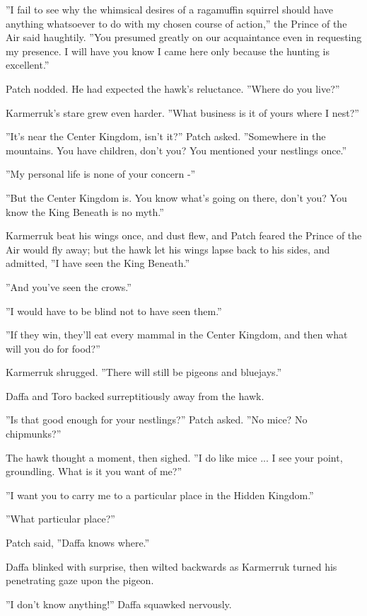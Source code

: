 \documentclass[12pt]{book}
\begin{document}
 ''I fail to see why the whimsical desires of a ragamuffin squirrel should have anything whatsoever to do with my chosen course of action,'' the Prince of the Air said haughtily. ''You presumed greatly on our acquaintance even in requesting my presence. I will have you know I came here only because the hunting is excellent.''\par
 Patch nodded. He had expected the hawk's reluctance. ''Where do you live?''\par
 Karmerruk's stare grew even harder. ''What business is it of yours where I nest?''\par
 ''It's near the Center Kingdom, isn't it?'' Patch asked. ''Somewhere in the mountains. You have children, don't you? You mentioned your nestlings once.''\par
 ''My personal life is none of your concern -''\par
 ''But the Center Kingdom is. You know what's going on there, don't you? You know the King Beneath is no myth.''\par
 Karmerruk beat his wings once, and dust flew, and Patch feared the Prince of the Air would fly away; but the hawk let his wings lapse back to his sides, and admitted, ''I have seen the King Beneath.''\par
 ''And you've seen the crows.''\par
 ''I would have to be blind not to have seen them.''\par
 ''If they win, they'll eat every mammal in the Center Kingdom, and then what will you do for food?''\par
 Karmerruk shrugged. ''There will still be pigeons and bluejays.''\par
 Daffa and Toro backed surreptitiously away from the hawk.\par
 ''Is that good enough for your nestlings?'' Patch asked. ''No mice? No chipmunks?''\par
 The hawk thought a moment, then sighed. ''I do like mice ... I see your point, groundling. What is it you want of me?''\par
 ''I want you to carry me to a particular place in the Hidden Kingdom.''\par
 ''What particular place?''\par
 Patch said, ''Daffa knows where.''\par
 Daffa blinked with surprise, then wilted backwards as Karmerruk turned his penetrating gaze upon the pigeon.\par
''I don't know anything!'' Daffa squawked nervously.\par
\end{document}

